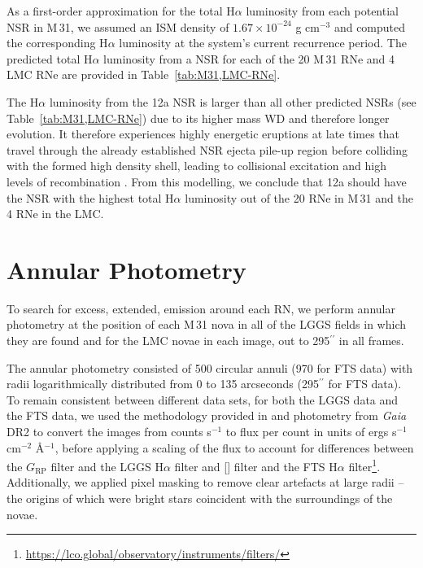 \documentclass[fleqn,usenatbib]{mnras}
\begin{document}
As a first-order approximation for the total H$\alpha$ luminosity from each potential NSR in M\,31, we assumed an ISM density of $1.67 \times 10^{-24}$ g cm$^{-3}$ and computed the corresponding H$\alpha$ luminosity at the system's current recurrence period. The predicted total H$\alpha$ luminosity from a NSR for each of the 20 M\,31 RNe and 4 LMC RNe are provided in Table~\ref{tab:M31,LMC-RNe}.

The H$\alpha$ luminosity from the 12a NSR is larger than all other predicted NSRs  (see Table~\ref{tab:M31,LMC-RNe}) due to its higher mass WD and therefore longer evolution. It therefore experiences highly energetic eruptions at late times that travel through the already established NSR ejecta pile-up region before colliding with the formed high density shell, leading to collisional excitation and high levels of recombination \citep{2023MNRAS.521.3004H}. From this modelling, we conclude that 12a should have the NSR with the highest total H$\alpha$ luminosity out of the 20 RNe in M\,31 and the 4 RNe in the LMC.

\section{Annular Photometry}\label{sec:Annular Photometry}
To search for excess, extended, emission around each RN, we perform annular photometry at the position of each M\,31 nova in all of the LGGS fields in which they are found and for the LMC novae in each image, out to 295$^{\prime\prime}$ in all frames. 

The annular photometry consisted of 500 circular annuli (970 for FTS data) with radii logarithmically distributed from 0 to 135 arcseconds (295$^{\prime\prime}$ for FTS data). To remain consistent between different data sets, for both the LGGS data and the FTS data, we used the methodology provided in \citet{2010ApJS..187..275S} and photometry from {\it Gaia} DR2 \citep{2016A&A...595A...1G,2018A&A...616A...1G} to convert the images from counts s$^{-1}$ to flux per count in units of ergs s$^{-1}$ cm$^{-2}$ \AA$^{-1}$, before applying a scaling of the flux to account for differences between the $G_{\text{RP}}$ filter \citep{2018A&A...616A...1G,2018A&A...617A.138W} and the LGGS H$\alpha$ filter and [] filter \citep{2007AJ....134.2474M} and the FTS H$\alpha$ filter\footnote{\url{https://lco.global/observatory/instruments/filters/}}. Additionally, we applied pixel masking to remove clear artefacts at large radii -- the origins of which were bright stars coincident with the surroundings of the novae.
\end{document}
